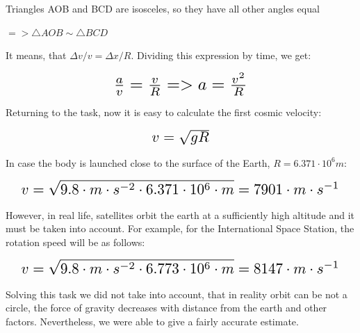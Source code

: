 \documentclass[a4paper,10pt]{article}
\begin{document}
\par
Triangles AOB and BCD are isosceles, so they have all other angles equal
\par
$=> \triangle AOB \sim \triangle BCD$
\par
It means, that $\Delta v / v = \Delta x / R$. Dividing this expression by time, we get:
\begin{center}
\[ \scalebox{1.75}{$\frac{a}{v} = \frac{v}{R} => a = \frac{v^2}{R}$} \]
\end{center}
\par
Returning to the task, now it is easy to calculate the first cosmic velocity:
\begin{center}
\[ \scalebox{1.5}{$v = \sqrt{gR}$} \]
\end{center}
In case the body is launched close to the surface of the Earth, $R = 6.371 \cdot 10^6 m$:
\begin{center}
\[ \scalebox{1.5}{$v = \sqrt{9.8 \cdot m \cdot s^{-2} \cdot 6.371 \cdot 10^6 \cdot m} = 7901 \cdot m \cdot s^{-1}$} \]
\end{center}
However, in real life, satellites orbit the earth at a sufficiently high altitude and it must be taken into account. For example, for the International Space Station, the rotation speed will be as follows:
\begin{center}
\[ \scalebox{1.5}{$v = \sqrt{9.8 \cdot m \cdot s^{-2} \cdot 6.773 \cdot 10^6 \cdot m} = 8147 \cdot m \cdot s^{-1}$} \]
\end{center}
Solving this task we did not take into account, that in reality orbit can be not a circle, the force of gravity decreases with distance from the earth and other factors. Nevertheless, we were able to give a fairly accurate estimate.
\end{document}
